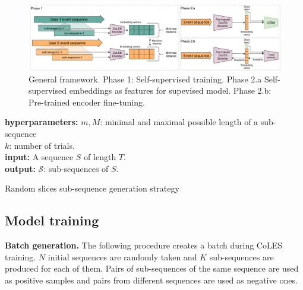 \documentclass[sigconf]{acmart}
\begin{document}
\begin{figure}[htbp]
  \includegraphics[width=\linewidth]{figures/CoLES.pdf}
\caption{General framework. Phase 1: Self-supervised training. Phase 2.a Self-supervised embeddings as features for supevised model. Phase 2.b: Pre-trained encoder fine-tuning. }
  \label{fig-arch}
\end{figure}



\begin{algorithm}
\SetAlgoLined
\textbf{hyperparameters:} $m, M$: minimal and maximal possible length of a sub-sequence\\ $k$: number of trials.\\ %
\textbf{input:} A sequence $S$ of length $T$. \\
\textbf{output:} $\mathcal{S}$: sub-sequences of $S$. \\

\BlankLine
\caption{Random slices sub-sequence generation strategy}
\label{alg-slce-ss}
\end{algorithm}


\subsection{Model training} \label{sec-training}

\textbf{Batch generation.} The following procedure creates a batch during CoLES training. $N$ initial sequences are randomly taken and $K$ sub-sequences are produced for each of them. Pairs of sub-sequences of the same sequence are used as positive samples and pairs from different sequences are used as negative ones.
\end{document}
